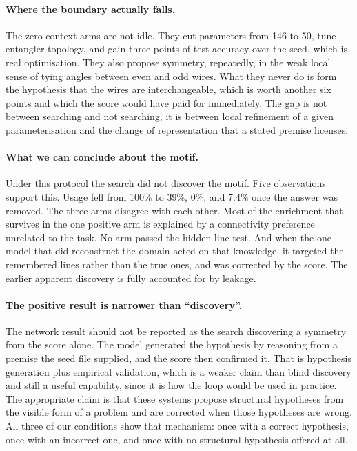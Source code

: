 \documentclass[11pt]{article}
\begin{document}
\paragraph{Where the boundary actually falls.}
The zero-context arms are not idle. They cut parameters from 146 to 50, tune
entangler topology, and gain three points of test accuracy over the seed, which
is real optimisation. They also propose symmetry, repeatedly, in the weak local
sense of tying angles between even and odd wires. What they never do is form the
hypothesis that the wires are interchangeable, which is worth another six points
and which the score would have paid for immediately. The gap is not between
searching and not searching, it is between local refinement of a given
parameterisation and the change of representation that a stated premise licenses.

\paragraph{What we can conclude about the motif.}
Under this protocol the search did not discover the motif. Five observations
support this. Usage fell from 100\% to 39\%, 0\%, and 7.4\% once the answer was
removed. The three arms disagree with each other. Most of the enrichment that
survives in the one positive arm is explained by a connectivity preference
unrelated to the task. No arm passed the hidden-line test. And when the one model
that did reconstruct the domain acted on that knowledge, it targeted the
remembered lines rather than the true ones, and was corrected by the score. The
earlier apparent discovery is fully accounted for by leakage.

\paragraph{The positive result is narrower than ``discovery''.}
The network result should not be reported as the search discovering a symmetry
from the score alone. The model generated the hypothesis by reasoning from a
premise the seed file supplied, and the score then confirmed it. That is
hypothesis generation plus empirical validation, which is a weaker claim than
blind discovery and still a useful capability, since it is how the loop would be
used in practice. The appropriate claim is that these systems propose structural
hypotheses from the visible form of a problem and are corrected when those
hypotheses are wrong. All three of our conditions show that mechanism: once with
a correct hypothesis, once with an incorrect one, and once with no structural
hypothesis offered at all.
\end{document}
